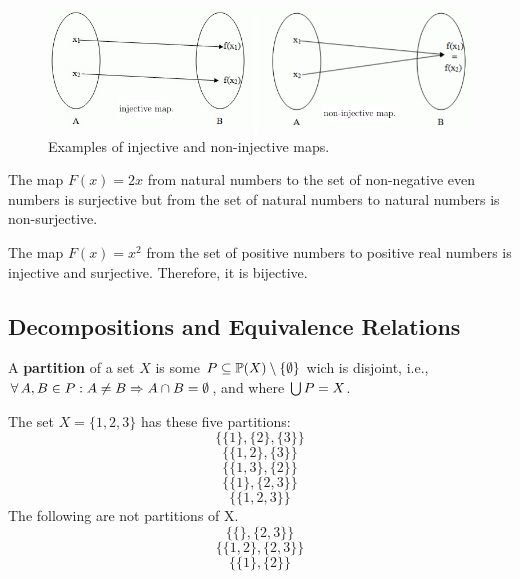 \documentclass[12pt]{book}
\begin{document}
\begin{figure}
    \begin{center}
       \includegraphics[scale =0.8]{p11.png}
       \caption{Examples of injective and non-injective maps.}
	    \label{fig:injct}
    \end{center}
	
\end{figure}
\begin{examp}\label{exp:Specialmaps}
  The map $F(x) = 2 x $ from natural numbers to the set of non-negative even numbers is surjective but from the set of natural numbers to natural numbers is non-surjective.
\end{examp}
\begin{examp}\label{exp:Specialmaps}
  The map $F(x) = x^2$ from the set of positive numbers to positive real numbers is injective and surjective. Therefore, it is bijective.
\end{examp}

\subsection{Decompositions and Equivalence Relations}
\label{sec:Decompositions}

\begin{defi}\label{def:Decompositions}
  A \textbf{partition} of a set $X$ is some $P \subseteq \operatorname{\mathbb{P}}(X) \setminus \{ \emptyset \}$ wich is disjoint, i.e., $\forall\, A, B \in P : A \ne B \Rightarrow A \cap B = \emptyset$, and where $\bigcup P = X$.
\end{defi}
\begin{examp}\label{exp:Decompositions}
  The set $X = \{ 1, 2, 3 \} $ has these five partitions:
  $$ \{ \{1\}, \{2\}, \{3\}\}$$
  $$ \{ \{1,2\}, \{3\}\}$$
  $$ \{ \{1, 3\}, \{2\}\}$$
  $$ \{ \{1\}, \{2, 3\}\}$$
  $$ \{ \{ 1, 2, 3 \}\}$$
  The following are not partitions of X.
  $$ \{ \{\}, \{2, 3\}\}$$
  $$ \{ \{1, 2\}, \{2, 3\}\}$$
  $$ \{ \{1\}, \{2\}\}$$
\end{examp}
\end{document}
